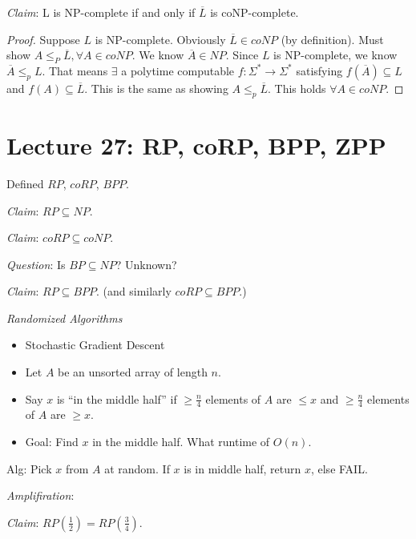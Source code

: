 \emph{Claim}:  L is NP-complete if and only if $\overline{L}$ is coNP-complete.

\begin{proof}
    Suppose $L$ is NP-complete. Obviously $\overline{L} \in coNP$ (by definition). Must show $A \leq_{P} \overline{L}, \forall A \in coNP$. We know $\overline{A} \in NP$. Since $L$ is NP-complete, we know $\overline{A} \leq_{p} L$. That means $\exists$ a polytime computable $f : \Sigma^* \rightarrow \Sigma^*$ satisfying $f(\overline{A}) \subseteq L$ and $f(A) \subseteq \overline{L}$. This is the same as showing $A \leq_{p} \overline{L}$. This holds $\forall A \in coNP$.
\end{proof}

\section*{Lecture 27: RP, coRP, BPP, ZPP}

Defined $RP$, $coRP$, $BPP$.

\emph{Claim}: $RP \subseteq NP$.

\emph{Claim}: $coRP \subseteq coNP$.

\emph{Question}: Is $BP \subseteq NP$? Unknown?

\emph{Claim}: $RP \subseteq BPP$. (and similarly $coRP \subseteq BPP$.)

\emph{Randomized Algorithms}

\begin{itemize}
    \item Stochastic Gradient Descent
    \item Let $A$ be an unsorted array of length $n$.
    \item Say $x$ is ``in the middle half'' if $\geq \frac{n}{4}$ elements of $A$ are $\leq x$ and $\geq \frac{n}{4}$ elements of $A$ are $\geq x$.
    \item Goal: Find $x$ in the middle half. What runtime of $O(n)$.
\end{itemize}

Alg: Pick $x$ from $A$ at random. If $x$ is in middle half, return $x$, else FAIL.

\emph{Amplifiration}:

\emph{Claim}: $RP(\frac{1}{2}) = RP(\frac{3}{4})$.


